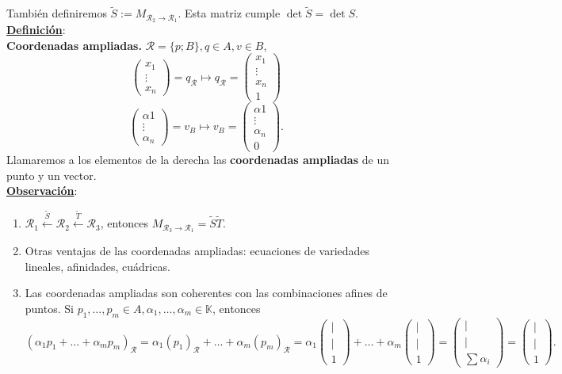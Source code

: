 \documentclass[11pt]{article}
\newcommand{\defi}{\underline{\textbf{Definición}}:\\}
\newcommand{\obs}{\underline{\textbf{Observación}}: }
\begin{document}
También definiremos $\tilde{S}:=M_{\mathcal{R}_2\rightarrow\mathcal{R}_1}$. Esta matriz cumple $\det\tilde{S}=\det
S$.\\
\defi \textbf{Coordenadas ampliadas.} $\mathcal{R}=\{p;B\},q\in A,v\in B$,
$$
\begin{pmatrix}
x_1\\
\vdots\\
x_n
\end{pmatrix}=q_{\mathcal{R}}\longmapsto q_{\mathcal{R}}=\begin{pmatrix}
x_1\\
\vdots\\
x_n\\
1
\end{pmatrix}
$$
$$
\begin{pmatrix}
\alpha1\\
\vdots\\
\alpha_n
\end{pmatrix}=v_B\longmapsto v_B=\begin{pmatrix}
\alpha1\\
\vdots\\
\alpha_n\\
0
\end{pmatrix}.
$$
Llamaremos a los elementos de la derecha las \textbf{coordenadas ampliadas} de un punto y un vector.\\
\obs
\begin{enumerate}
	\item $\mathcal{R}_1\xleftarrow{\tilde{S}}\mathcal{R}_2\xleftarrow{\tilde{T}}\mathcal{R}_3$, entonces $M_{\mathcal{R}_3\rightarrow\mathcal{R}_1}=\tilde{S}\tilde{T}.$
	\item Otras ventajas de las coordenadas ampliadas: ecuaciones de variedades lineales, afinidades, cuádricas.
	\item Las coordenadas ampliadas son coherentes con las combinaciones afines de puntos. Si $p_1,\ldots,p_m\in A,\alpha_1,\ldots,\alpha_m\in\mathbb{K}$, entonces
	$$
	(\alpha_1p_1+\ldots+\alpha_mp_m)_{\mathcal{R}}=\alpha_1(p_1)_{\mathcal{R}}+\ldots+\alpha_m(p_m)_{\mathcal{R}}=\alpha_1\begin{pmatrix}
	\vert\\
	\vert\\
	1
	\end{pmatrix}+\ldots+\alpha_m\begin{pmatrix}
	\vert\\
	\vert\\
	1
	\end{pmatrix}=\begin{pmatrix}
	\vert\\
	\vert\\
	\sum\alpha_i
	\end{pmatrix}=\begin{pmatrix}
	\vert\\
	\vert\\
	1
	\end{pmatrix}.
	$$
\end{enumerate}
\end{document}

